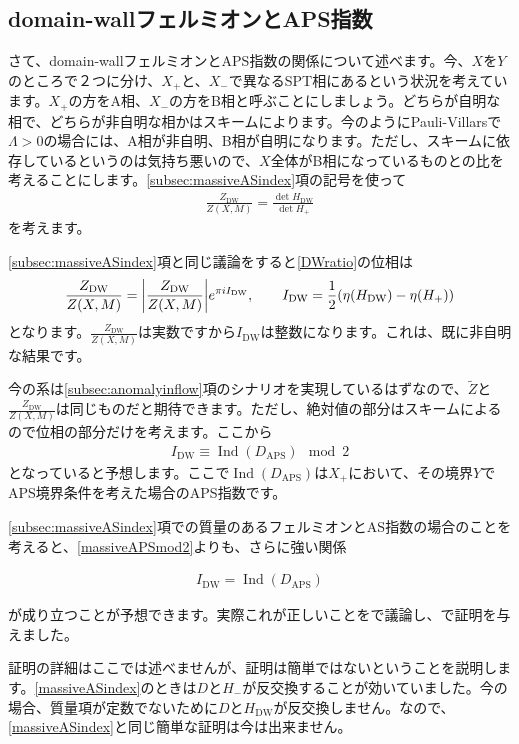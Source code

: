 \documentclass[paper=a4, fontsize=12pt, line_length=16cm, number_of_lines=33,dvipdfmx]{jlreq}
\numberwithin{equation}{section}
\newcommand{\Zt}{\widetilde{Z}}
\DeclareMathOperator{\Ind}{\mathrm{Ind}}
\newcommand{\DAPS}{D_{\mathrm{APS}}}
\newcommand{\Hm}{H_{-}}
\newcommand{\Hp}{H_{+}}
\newcommand{\HDW}{H_{\mathrm{DW}}}
\newcommand{\ZDW}{Z_{\mathrm{DW}}}
\newcommand{\IDW}{I_{\mathrm{DW}}}
\newenvironment{important}{\begin{tcolorbox}[
  colback = white,
  colframe = red!35,
  boxrule = 2mm,
  fonttitle = \bfseries,
  after = \noindent] }{\end{tcolorbox}}
\begin{document}
\subsection{domain-wallフェルミオンとAPS指数}
さて、domain-wallフェルミオンとAPS指数の関係について述べます。今、$X$を$Y$のところで２つに分け、$X_{+}$と、$X_{-}$で異なるSPT相にあるという状況を考えています。$X_{+}$の方をA相、$X_{-}$の方をB相と呼ぶことにしましょう。どちらが自明な相で、どちらが非自明な相かはスキームによります。今のようにPauli-Villarsで$\Lambda>0$の場合には、A相が非自明、B相が自明になります。ただし、スキームに依存しているというのは気持ち悪いので、$X$全体がB相になっているものとの比を考えることにします。\ref{subsec:massiveASindex}項の記号を使って
\begin{align}
  \frac{\ZDW}{Z(X,M)}=\frac{\det \HDW}{\det \Hp}\label{DWratio}
\end{align}
を考えます。

\ref{subsec:massiveASindex}項と同じ議論をすると\eqref{DWratio}の位相は
\begin{align}
  \frac{\ZDW}{Z(X,M)}=\qty|\frac{\ZDW}{Z(X,M)}|e^{\pi i \IDW},\qquad
  \IDW=\frac12 (\eta(\HDW)-\eta(\Hp))
\end{align}
となります。$\frac{\ZDW}{Z(X,M)}$は実数ですから$\IDW$は整数になります。これは、既に非自明な結果です。

今の系は\ref{subsec:anomalyinflow}項のシナリオを実現しているはずなので、$\Zt$と$\frac{\ZDW}{Z(X,M)}$は同じものだと期待できます。ただし、絶対値の部分はスキームによるので位相の部分だけを考えます。ここから
\begin{align}
  \IDW\equiv \Ind(\DAPS)\mod 2 \label{massiveAPSmod2}
\end{align}
となっていると予想します。ここで$\Ind(\DAPS)$は$X_{+}$において、その境界$Y$でAPS境界条件を考えた場合のAPS指数です。

\ref{subsec:massiveASindex}項での質量のあるフェルミオンとAS指数の場合のことを考えると、\eqref{massiveAPSmod2}よりも、さらに強い関係
\begin{important}
  \begin{align}
    \IDW=\Ind(\DAPS)\label{massiveAPSindex}
  \end{align}    
\end{important}
が成り立つことが予想できます。実際これが正しいことを\cite{Fukaya:2017tsq}で議論し、\cite{Fukaya:2019qlf}で証明を与えました。

証明の詳細はここでは述べませんが、証明は簡単ではないということを説明します。\eqref{massiveASindex}のときは$D$と$\Hm$が反交換することが効いていました。今の場合、質量項が定数でないために$D$と$\HDW$が反交換しません。なので、\eqref{massiveASindex}と同じ簡単な証明は今は出来ません。
\end{document}
